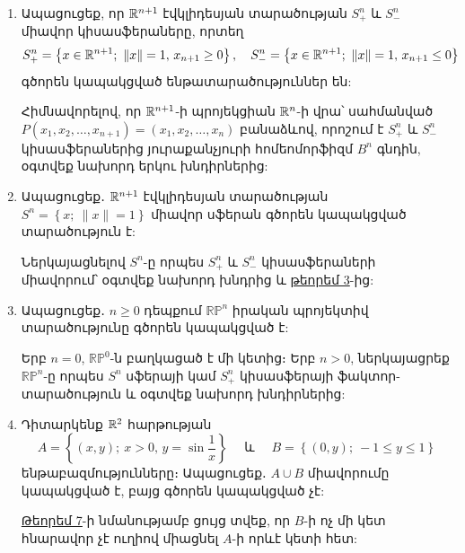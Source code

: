 \begin{enumerate}[label=\thesection.\arabic*.]
\item Ապացուցեք, որ $\mathbb{R}^{n+1}$ էվկլիդեսյան տարածության $S^n_+$ և $S^n_-$ միավոր կիսա\-սֆե\-րաները, որտեղ
\[ 
S^n_+ = \left\{x \in \mathbb{R}^{n+1};\ \|x\|=1,\, x_{n+1} \ge 0\right\}, \quad S^n_- = \left\{x \in \mathbb{R}^{n+1};\ \|x\|=1,\, x_{n+1} \le 0\right\}
\]
գծորեն կապակցված ենթատարածություններ են:
\begin{hint}
Հիմնավորելով, որ $\mathbb{R}^{n+1}$-ի պրոյեկցիան $\mathbb{R}^n$-ի վրա՝ սահմանված $P(x_1, x_2, \dots, x_{n+1}) = (x_1, x_2, \dots, x_n)$ բանաձևով, որոշում է $S^n_+$ և $S^n_-$ կիսա\-սֆե\-րաներից յուրաքանչյուրի հոմեոմորֆիզմ $B^n$ գնդին, օգտվեք նախորդ երկու խնդիր\-ներից:
\end{hint}

\item Ապացուցեք․ $\mathbb{R}^{n+1}$ էվկլիդեսյան տարածության $S^n = \left\{x;\ \|x\|=1\right\}$ միավոր սֆերան գծորեն կապակցված տարածություն է:
\begin{hint}
Ներկայացնելով $S^n$-ը որպես $S^n_+$ և $S^n_-$ կիսասֆերաների միավո\-րում՝ օգտվեք նախորդ խնդրից և \hyperref[ch15thm3]{թեորեմ 3}-ից:
\end{hint}

\item Ապացուցեք․ $n \ge 0$ դեպքում $\mathbb{RP}^n$ իրական պրոյեկտիվ տարածությունը գծո\-րեն կապակցված է:
\begin{hint}
Երբ $n=0$, $\mathbb{RP}^0$-ն բաղկացած է մի կետից։ Երբ $n > 0$, ներկա\-յաց\-րեք $\mathbb{RP}^n$-ը որպես $S^n$ սֆերայի կամ $S^n_+$ կիսասֆերայի ֆակտոր-տարածու\-թյուն և օգտվեք նախորդ խնդիրներից:
\end{hint}

\item Դիտարկենք $\mathbb{R}^2$ հարթության 
\[
A = \left\{(x, y);\ x > 0,\, y = \sin \dfrac{1}{x}\right\} \quad  \text{ և } \quad B = \left\{(0, y);\ -1 \le y \le 1\right\}
\] 
ենթաբազմությունները։ Ապացուցեք․ $A \cup B$ միավորումը կապակցված է, բայց գծորեն կապակցված չէ:
\begin{hint}
\hyperref[ch15thm7]{Թեորեմ 7}-ի նմանությամբ ցույց տվեք, որ $B$-ի ոչ մի կետ հնա\-րա\-վոր չէ ուղիով միացնել $A$-ի որևէ կետի հետ:
\end{hint}

\end{enumerate}
